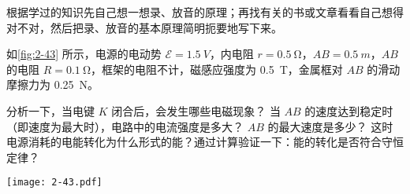 \begin{Exercise}
\begin{question}
  根据学过的知识先自己想一想录、放音的原理；再找有关的书或文章看看自己想得对不对，然后把录、放音的基本原理简明扼要地写下来。
  \item 如\cref{fig:2-43} 所示，电源的电动势 $\mathcal{E}=\qty{1.5}{V}$，内电阻 $r=\qty{0.5}{\ohm}$，$AB=\qty{0.5}{m}$，$AB$ 的电阻 $R=\qty{0.1}{\ohm}$，框架的电阻不计，磁感应强度为 \qty{0.5}{T}，金属框对 $AB$ 的滑动摩擦力为 \qty{0.25}{N}。
  \begin{tasks}
    \task 分析一下，当电键 $K$ 闭合后，会发生哪些电磁现象？
    \task 当 $AB$ 的速度达到稳定时（即速度为最大时），电路中的电流强度是多大？
    \task $AB$ 的最大速度是多少？
    \task 这时电源消耗的电能转化为什么形式的能？通过计算验证一下：能的转化是否符合守恒定律？
  \end{tasks}
  \begin{figurehere}
    \begin{minipage}{\linewidth}\centering
      \texttt{[image: 2-43.pdf]}
      \caption{}\label{fig:2-43}
    \end{minipage}
  \end{figurehere}
\end{question}
\end{Exercise}